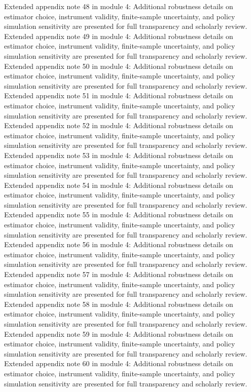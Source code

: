 \documentclass[preprint,12pt]{elsarticle}
\begin{document}
Extended appendix note 48 in module 4: Additional robustness details on estimator choice, instrument validity, finite-sample uncertainty, and policy simulation sensitivity are presented for full transparency and scholarly review.
Extended appendix note 49 in module 4: Additional robustness details on estimator choice, instrument validity, finite-sample uncertainty, and policy simulation sensitivity are presented for full transparency and scholarly review.
Extended appendix note 50 in module 4: Additional robustness details on estimator choice, instrument validity, finite-sample uncertainty, and policy simulation sensitivity are presented for full transparency and scholarly review.
Extended appendix note 51 in module 4: Additional robustness details on estimator choice, instrument validity, finite-sample uncertainty, and policy simulation sensitivity are presented for full transparency and scholarly review.
Extended appendix note 52 in module 4: Additional robustness details on estimator choice, instrument validity, finite-sample uncertainty, and policy simulation sensitivity are presented for full transparency and scholarly review.
Extended appendix note 53 in module 4: Additional robustness details on estimator choice, instrument validity, finite-sample uncertainty, and policy simulation sensitivity are presented for full transparency and scholarly review.
Extended appendix note 54 in module 4: Additional robustness details on estimator choice, instrument validity, finite-sample uncertainty, and policy simulation sensitivity are presented for full transparency and scholarly review.
Extended appendix note 55 in module 4: Additional robustness details on estimator choice, instrument validity, finite-sample uncertainty, and policy simulation sensitivity are presented for full transparency and scholarly review.
Extended appendix note 56 in module 4: Additional robustness details on estimator choice, instrument validity, finite-sample uncertainty, and policy simulation sensitivity are presented for full transparency and scholarly review.
Extended appendix note 57 in module 4: Additional robustness details on estimator choice, instrument validity, finite-sample uncertainty, and policy simulation sensitivity are presented for full transparency and scholarly review.
Extended appendix note 58 in module 4: Additional robustness details on estimator choice, instrument validity, finite-sample uncertainty, and policy simulation sensitivity are presented for full transparency and scholarly review.
Extended appendix note 59 in module 4: Additional robustness details on estimator choice, instrument validity, finite-sample uncertainty, and policy simulation sensitivity are presented for full transparency and scholarly review.
Extended appendix note 60 in module 4: Additional robustness details on estimator choice, instrument validity, finite-sample uncertainty, and policy simulation sensitivity are presented for full transparency and scholarly review.
\end{document}
